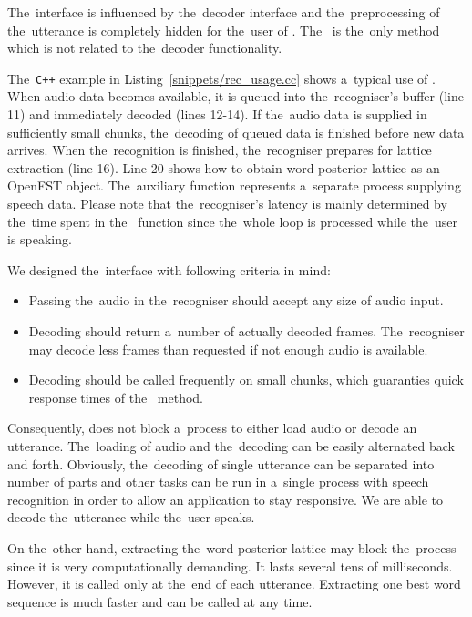 The~interface is influenced by the~decoder interface and the~preprocessing of the~utterance is completely hidden for the~user of .
The~ is the~only method which is not related to the~decoder functionality. 

The~\verb!C++! example in Listing~\ref{snippets/rec_usage.cc} shows a~typical use of .
When audio data becomes available, it is queued into the~recogniser's buffer (line 11) and immediately decoded (lines 12-14).
If the~audio data is supplied in sufficiently small chunks, the~decoding of queued data is finished before new data arrives.
When the~recognition is finished, the~recogniser prepares for lattice extraction (line 16).
Line 20 shows how to obtain word posterior lattice as an OpenFST object.
The~auxiliary  function represents a~separate process supplying speech data.
Please note that the~recogniser's latency is mainly determined by the~time spent in the~ function since the~whole loop is processed while the~user is speaking.


We designed the~interface with following criteria in mind:
\begin{itemize}
    \item Passing the~audio in the~recogniser should accept any size of audio input.
    \item Decoding should return a~number of actually decoded frames. The~recogniser may decode less frames than requested if not enough audio is available.
    \item Decoding should be called frequently on small chunks, which guaranties quick response times of the~ method.
\end{itemize}

Consequently,  does not block a~process to either load audio or decode an utterance.
The~loading of audio and the~decoding can be easily alternated back and forth.
Obviously, the~decoding of single utterance can be separated into number of parts and other tasks can be run in a~single process with speech recognition in order to allow an application to stay responsive.
We are able to decode the~utterance while the~user speaks.

On the~other hand, extracting the~word posterior lattice may block the~process since it is very computationally demanding.
It lasts several tens of milliseconds. 
However, it is called only at the~end of each utterance.
Extracting one best word sequence is much faster and can be called at any time.

